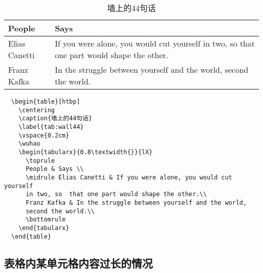 \begin{table}[htbp]
  \centering
  \caption{墙上的44句话}
  \label{tab:wall44}
  \vspace{0.2cm}
  \wuhao
  \begin{tabularx}{0.8\textwidth{}}{lX}
    \toprule
    People        & Says                                                 \\
    \midrule
    Elias Canetti & If you were alone, you would cut yourself in two, so
    that one part would shape the other.                                 \\
    Franz Kafka   & In the struggle between yourself and the world,
    second the world.                                                    \\
    \bottomrule
  \end{tabularx}
\end{table}

\begin{lstlisting}
  \begin{table}[htbp]
    \centering
    \caption{墙上的44句话}
    \label{tab:wall44}
    \vspace{0.2cm}
    \wuhao
    \begin{tabularx}{0.8\textwidth{}}{lX}
      \toprule
      People & Says \\
      \midrule Elias Canetti & If you were alone, you would cut yourself
      in two, so  that one part would shape the other.\\
      Franz Kafka & In the struggle between yourself and the world,
      second the world.\\
      \bottomrule
    \end{tabularx}
  \end{table}
\end{lstlisting}

\subsection{表格内某单元格内容过长的情况}


